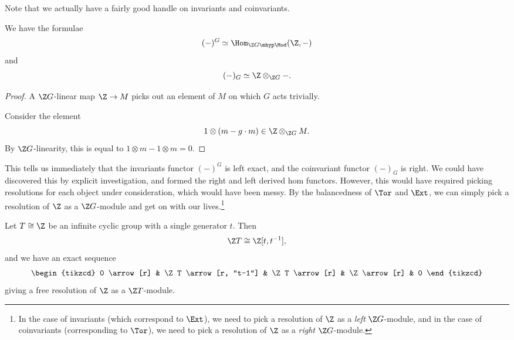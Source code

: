 \documentclass[main.tex]{subfiles}
\begin{document}
Note that we actually have a fairly good handle on invariants and coinvariants.

\begin{lemma}
  \label{lemma:invariants_and_coinvariants_in_terms_of_tensor_and_hom}
  We have the formulae
  \begin{equation*}
    (-)^{G} \simeq \Hom_{\Z G\mhyp\Mod}(\Z, -)
  \end{equation*}
  and
  \begin{equation*}
    (-)_{G} \simeq \Z \otimes_{\Z G} -.
  \end{equation*}
\end{lemma}
\begin{proof}
  A $\Z G$-linear map $\Z \to M$ picks out an element of $M$ on which $G$ acts trivially.

  Consider the element
  \begin{equation*}
    1 \otimes(m - g\cdot m) \in \Z \otimes_{\Z G} M.
  \end{equation*}
  By $\Z G$-linearity, this is equal to $1 \otimes m - 1 \otimes m = 0$.
\end{proof}

This tells us immediately that the invariants functor $(-)^{G}$ is left exact, and the coinvariant functor $(-)_{G}$ is right. We could have discovered this by explicit investigation, and formed the right and left derived hom functors. However, this would have required picking resolutions for each object under consideration, which would have been messy. By the balancedness of $\Tor$ and $\Ext$, we can simply pick a resolution of $\Z$ as a $\Z G$-module and get on with our lives.\footnote{In the case of invariants (which correspond to $\Ext$), we need to pick a resolution of $\Z$ as a \emph{left} $\Z G$-module, and in the case of coinvariants (corresponding to $\Tor$), we need to pick a resolution of $\Z$ as a \emph{right} $\Z G$-module.}

\begin{example}
  Let $T \cong \Z$ be an infinite cyclic group with a single generator $t$. Then
  \begin{equation*}
    \Z T \cong \Z[t, t^{-1}],
  \end{equation*}
  and we have an exact sequence
  \begin{equation*}
    \begin{tikzcd}
      0
      \arrow[r]
      & \Z T
      \arrow[r, "t-1"]
      & \Z T
      \arrow[r]
      & \Z
      \arrow[r]
      & 0
    \end{tikzcd}
  \end{equation*}
  giving a free resolution of $\Z$ as a $\Z T$-module.
\end{example}
\end{document}
